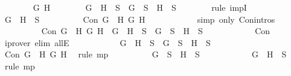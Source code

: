 \begin{isabellebody}
\ \ \ \ \ \ \isamarkupfalse%
\ G\ H\isanewline
\ \ \ \ \ \ \isamarkupfalse%
\ {\isachardoublequoteopen}G\ \isactrlbold {\isasymand}\ H\ {\isasymin}\ S\ {\isasymlongrightarrow}\ G\ {\isasymin}\ S\ {\isasymand}\ H\ {\isasymin}\ S{\isachardoublequoteclose}\isanewline
\ \ \ \ \ \ \isamarkupfalse%
\ {\isacharparenleft}rule\ impI{\isacharparenright}\isanewline
\ \ \ \ \ \ \ \ \isamarkupfalse%
\ {\isachardoublequoteopen}G\ \isactrlbold {\isasymand}\ H\ {\isasymin}\ S{\isachardoublequoteclose}\isanewline
\ \ \ \ \ \ \ \ \isamarkupfalse%
\ {\isachardoublequoteopen}Con\ {\isacharparenleft}G\ \isactrlbold {\isasymand}\ H{\isacharparenright}\ G\ H{\isachardoublequoteclose}\isanewline
\ \ \ \ \ \ \ \ \ \ \isamarkupfalse%
\ {\isacharparenleft}simp\ only{\isacharcolon}\ Con{\isachardot}intros{\isacharparenleft}{}{\isacharparenright}{\isacharparenright}\isanewline
\ \ \ \ \ \ \ \ \isamarkupfalse%
\ {\isachardoublequoteopen}Con\ {\isacharparenleft}G\ \isactrlbold {\isasymand}\ H{\isacharparenright}\ G\ H\ {\isasymlongrightarrow}\ G\ \isactrlbold {\isasymand}\ H\ {\isasymin}\ S\ {\isasymlongrightarrow}\ G\ {\isasymin}\ S\ {\isasymand}\ H\ {\isasymin}\ S{\isachardoublequoteclose}\isanewline
\ \ \ \ \ \ \ \ \ \ \isamarkupfalse%
\ Con\ \isamarkupfalse%
\ {\isacharparenleft}iprover\ elim{\isacharcolon}\ allE{\isacharparenright}\isanewline
\ \ \ \ \ \ \ \ \isamarkupfalse%
\ \isamarkupfalse%
\ {\isachardoublequoteopen}G\ \isactrlbold {\isasymand}\ H\ {\isasymin}\ S\ {\isasymlongrightarrow}\ G\ {\isasymin}\ S\ {\isasymand}\ H\ {\isasymin}\ S{\isachardoublequoteclose}\isanewline
\ \ \ \ \ \ \ \ \ \ \isamarkupfalse%
\ {\isacartoucheopen}Con\ {\isacharparenleft}G\ \isactrlbold {\isasymand}\ H{\isacharparenright}\ G\ H{\isacartoucheclose}\ \isamarkupfalse%
\ {\isacharparenleft}rule\ mp{\isacharparenright}\isanewline
\ \ \ \ \ \ \ \ \isamarkupfalse%
\ {\isachardoublequoteopen}G\ {\isasymin}\ S\ {\isasymand}\ H\ {\isasymin}\ S{\isachardoublequoteclose}\isanewline
\ \ \ \ \ \ \ \ \ \ \isamarkupfalse%
\ {\isacartoucheopen}G\ \isactrlbold {\isasymand}\ H\ {\isasymin}\ S{\isacartoucheclose}\ \isamarkupfalse%
\ {\isacharparenleft}rule\ mp{\isacharparenright}\isanewline
\ \ \ \ \ \ \isamarkupfalse%
\isanewline
\ \ \ \ \isamarkupfalse%
\isanewline
\ \ \ \ \isamarkupfalse%

\end{isabellebody}
